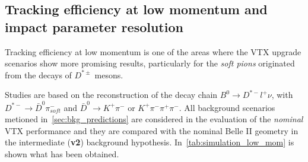 \subsection{Tracking efficiency at low momentum and impact parameter resolution}

Tracking efficiency at low momentum is one of the areas where the VTX upgrade scenarios show more promising results, particularly for the \textit{soft pions} originated from the decays of $D^{*\pm}$ mesons.

Studies are based on the reconstruction of the decay chain $B^{0} \rightarrow D^{*-}l^{+}\nu$, with $D^{*-} \rightarrow \bar{D}^{0} \pi^{-}_{soft}$ and $\bar{D}^{0} \rightarrow K^{+} \pi^{-}$ or $K^{+} \pi^{-} \pi^{+} \pi^{-}$. All background scenarios metioned in~\autoref{sec:bkg_predictions} are considered in the evaluation of the \textit{nominal} VTX performance and they are compared with the nominal Belle II geometry in the intermediate (\textbf{v2}) background hypothesis. In~\autoref{tab:simulation_low_mom} is shown what has been obtained.

\begin{comment}
\begin{table}[htbp]
 \caption{Reconstruction efficiency and purity for the the decay chain $B^{0} \rightarrow D^{*-}l^{+}\nu$, with $D^{*-} \rightarrow \bar{D}^{0} \pi^{-}_{soft}$ and $\bar{D}^{0} \rightarrow K^{+} \pi^{-}$, for the nominal Belle II detector at the intermediate background conditions (\textbf{v2}) and the nominal configuration of VTX in all three background scenarios.}
\label{tab:simulation_low_mom}
  \begin{center}
    \begin{tabular}{l|c|c|c|c}
      \hline\hline
      & Belle II (v2) & VTX (v1) & VTX (v2) & VTX (v3) \\
      \hline\hline
      Generated events & 32533 & 32559 & 32559 & 30255 \\
      \hline
      Correctly reconstructed signal & 10059 & 16913 & 16848 & 15583 \\
      \hline
      Combinatorial & 28495 & 51375 & 51826 & 47527 \\
      \hline\hline
      Efficiency & 30.9\% & 51.9\% & 51.7\% & 51.5\% \\
      \hline
      Purity & 26.1\% & 24.8\% & 24.5\% & 24.7\% \\
      \hline\hline
    \end{tabular}
  \end{center}
\end{table}
\end{comment}


